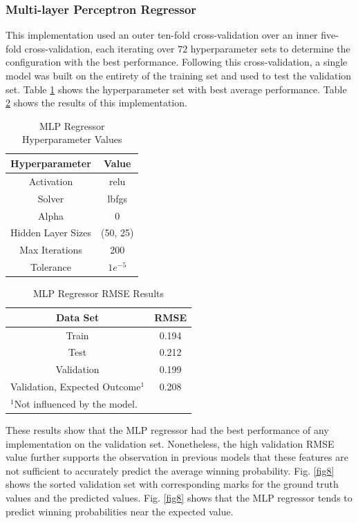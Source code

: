 \documentclass[conference]{IEEEtran}
\begin{document}
\subsubsection{Multi-layer Perceptron Regressor}
This implementation used an outer ten-fold cross-validation over an inner five-fold cross-validation, each iterating over $72$ hyperparameter sets to determine the configuration with the best performance. Following this cross-validation, a single model was built on the entirety of the training set and used to test the validation set. Table \ref{tab6} shows the hyperparameter set with best average performance. Table \ref{tab7} shows the results of this implementation.

\begin{table}[htbp]
\caption{MLP Regressor Hyperparameter Values}
\begin{center}
\begin{tabular}{|c||c|}
\hline
\textbf{Hyperparameter} & \textbf{Value} \\
\hline
\hline
Activation & relu \\
\hline
Solver & lbfgs \\
\hline
Alpha & 0 \\
\hline
Hidden Layer Sizes & (50, 25) \\
\hline
Max Iterations & 200 \\
\hline
Tolerance & $1e^{-5}$ \\
\hline
\end{tabular}
\label{tab6}
\end{center}
\end{table}

\begin{table}[htbp]
\caption{MLP Regressor RMSE Results}
\begin{center}
\begin{tabular}{|c||c|}
\hline
\textbf{Data Set} & \textbf{RMSE} \\
\hline
\hline
Train & 0.194 \\
\hline
Test & 0.212 \\
\hline
Validation & 0.199 \\
\hline
Validation, Expected Outcome$^{\mathrm{1}}$ & 0.208 \\
\hline
\multicolumn{2}{l}{$^{\mathrm{1}}$Not influenced by the model.}
\end{tabular}
\label{tab7}
\end{center}
\end{table}

These results show that the MLP regressor had the best performance of any implementation on the validation set. Nonetheless, the high validation RMSE value further supports the observation in previous models that these features are not sufficient to accurately predict the average winning probability. Fig. \ref{fig8} shows the sorted validation set with corresponding marks for the ground truth values and the predicted values.  Fig. \ref{fig8} shows that the MLP regressor tends to predict winning probabilities near the expected value. 
\end{document}
